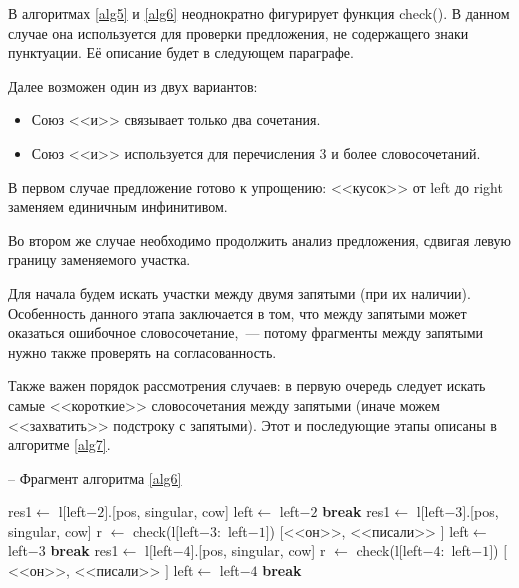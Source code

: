 \documentclass[main]{subfiles}
\begin{document}
В алгоритмах \ref{alg5} и \ref{alg6} неоднократно фигурирует функция check(). В данном случае она используется для проверки предложения, не содержащего знаки пунктуации. Её описание будет в следующем параграфе.

Далее возможен один из двух вариантов:
\begin{itemize}
	\item Союз <<и>> связывает только два сочетания.
	\item Союз <<и>> используется для перечисления $3$ и более словосочетаний.
\end{itemize}

В первом случае предложение готово к упрощению: <<кусок>> от left до right заменяем единичным инфинитивом.

Во втором же случае необходимо продолжить анализ предложения, сдвигая левую границу заменяемого участка.

Для начала будем искать участки между двумя запятыми (при их наличии). Особенность данного этапа заключается в том, что между запятыми может оказаться ошибочное словосочетание,~--- потому фрагменты между запятыми нужно также проверять на согласованность.

Также важен порядок рассмотрения случаев: в первую очередь следует искать самые <<короткие>> словосочетания между запятыми (иначе можем <<захватить>> подстроку с запятыми). Этот и последующие этапы описаны в алгоритме \ref{alg7}.

\begin{algorithm}
	\caption{-- Фрагмент алгоритма \ref{alg6}}\label{alg7}
	\begin{algorithmic}[1]
	 
	\State res1$\gets$ l$[$left$-2]$.[pos, singular, cow]
	\State left$\gets$ left$-2$
	\State \textbf{break}
	\EndIf
	\EndFor
	 
	\State  res1$\gets$ l$[$left$-3]$.[pos, singular, cow]
	\State r $\gets$ check(l$[$left$-3:$ left$-1 ]$)
	\State \Return $[$<<он>>, <<писали>> $]$
	\State left$\gets$ left$-3$
	\State \textbf{break}
	\EndIf
	\EndIf
	\EndFor
	\State  res1$\gets$ l$[$left$-4]$.[pos, singular, cow]
	\State r $\gets$ check(l$[$left$-4:$ left$-1 ]$)
	\State \Return $[$<<он>>, <<писали>> $]$
	\State left$\gets$ left$-4$
	\State \textbf{break}
	\EndIf
	\EndIf
	\end{algorithmic}
	\end{algorithm}
\end{document}
